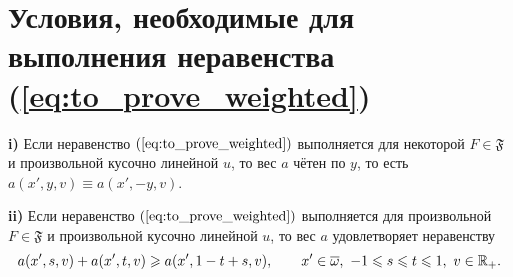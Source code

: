 \section{Условия, необходимые для выполнения неравенства (\ref{eq:to_prove_weighted})}
\label{sec:necessary_weighted}

\begin{thm}
\label{thm:necessary_conditions_weighted}
\textbf{\textup{i)}}
Если неравенство $(\ref{eq:to_prove_weighted})$ выполняется для некоторой $F \in \mathfrak{F}$ и произвольной кусочно линейной $u$,
то вес $a$ чётен по $y$, то есть $a(x', y, v) \equiv a(x', -y, v)$.

\textbf{\textup{ii)}}
Если неравенство $(\ref{eq:to_prove_weighted})$ выполняется для произвольной $F \in \mathfrak{F}$
и произвольной кусочно линейной $u$, то вес $a$ удовлетворяет неравенству
\begin{equation}
\label{eq:almostConcave}
a(x', s, v) + a(x', t, v) \ge a(x', 1 - t + s, v), \qquad x' \in \overline{\omega},\ -1 \le s \le t \le 1,\ v \in \Real_+.
\end{equation}
\end{thm}

